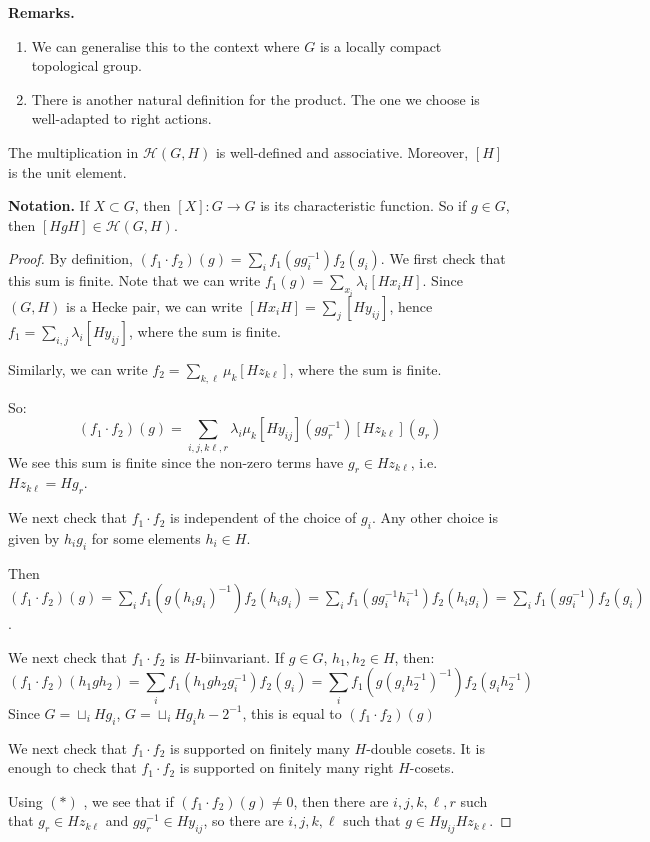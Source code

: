 \documentclass[10pt,a4paper]{article}
\begin{document}
\textbf{Remarks.}
\begin{enumerate}
  \item We can generalise this to the context where $G$ is a locally compact topological group.
  \item There is another natural definition for the product. The one we choose is well-adapted to right actions.
\end{enumerate}
\begin{lemma}
  The multiplication in $\mathcal{H}(G,H)$ is well-defined and associative. Moreover, $[H]$ is the unit element.
\end{lemma}
\textbf{Notation.} If $X \subset G$, then $[X]:G \to G$ is its characteristic function. So if $g \in G$, then $[HgH] \in \mathcal{H}(G,H)$.
\begin{proof}
  By definition, $(f_1\cdot f_2)(g) = \sum_{i}f_1(gg_i^{-1})f_2(g_i)$. We first check that this sum is finite. Note that we can write $f_1(g) = \sum_{x_i}\lambda_i [Hx_i H]$. Since $(G,H)$ is a Hecke pair, we can write $[Hx_iH] = \sum_j [Hy_{ij}]$, hence $f_1 = \sum_{i,j} \lambda_i [Hy_{ij}]$, where the sum is finite.

  Similarly, we can write $f_2 = \sum_{k,\ell}\mu_k [Hz_{k\ell}]$, where the sum is finite.

  So:
  \[(f_1\cdot f_2)(g) = \sum_{i,j,k\ell,r}\lambda_i \mu_k [Hy_{ij}](gg_r^{-1})[Hz_{k\ell}](g_r)\tag{$\ast$}\]
  We see this sum is finite since the non-zero terms have $g_r \in Hz_{k\ell}$, i.e. $Hz_{k\ell} = Hg_r$.

  We next check that $f_1\cdot f_2$ is independent of the choice of $g_i$. Any other choice is given by $h_i g_i$ for some elements $h_i \in H$.

  Then $(f_1\cdot f_2)(g) = \sum_{i} f_1(g(h_ig_i)^{-1})f_2(h_ig_i) = \sum_{i} f_1(gg_i^{-1}h_i^{-1})f_2(h_ig_i) = \sum_i f_1(gg_i^{-1})f_2(g_i)$.

  We next check that $f_1\cdot f_2$ is $H$-biinvariant. If $g \in G$, $h_1,h_2 \in H$, then:
  \[(f_1\cdot f_2)(h_1gh_2) = \sum_i f_1(h_1gh_2g_i^{-1})f_2(g_i) = \sum_i f_1(g(g_ih_2^{-1})^{-1})f_2(g_ih_2^{-1})\]
  Since $G = \sqcup_i Hg_i$, $G = \sqcup_{i} Hg_ih-2^{-1}$, this is equal to $(f_1\cdot f_2)(g)$

  We next check that $f_1\cdot f_2$ is supported on finitely many $H$-double cosets. It is enough to check that $f_1\cdot f_2$ is supported on finitely many right $H$-cosets.

  Using $(\ast)$ , we see that if $(f_1\cdot f_2)(g) \neq 0$, then there are $i,j,k,\ell, r$ such that $g_r \in Hz_{k\ell}$ and $gg_r^{-1}\in Hy_{ij}$, so there are $i,j,k,\ell$ such that $g \in Hy_{ij}Hz_{k\ell}$.


\end{proof}
\end{document}

